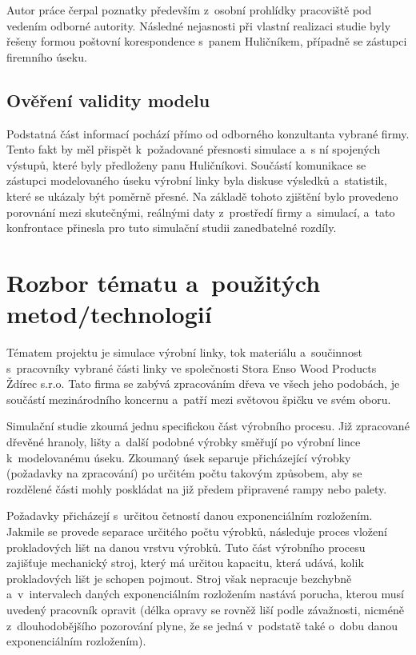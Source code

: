 \documentclass[a4paper, 11pt]{article}
\begin{document}
    Autor práce čerpal poznatky především z~osobní prohlídky pracoviště pod vedením odborné autority.
    Následné nejasnosti při vlastní realizaci studie byly řešeny formou poštovní korespondence s~panem Huličníkem, případně se zástupci firemního úseku.

\subsection{Ověření validity modelu}
    Podstatná část informací pochází přímo od odborného konzultanta vybrané firmy.
    Tento fakt by měl přispět k~požadované přesnosti simulace a~s ní spojených výstupů, které byly předloženy panu Huličníkovi.
    Součástí komunikace se zástupci modelovaného úseku výrobní linky byla diskuse výsledků a~statistik, které se ukázaly být poměrně přesné.
    Na základě tohoto zjištění bylo provedeno porovnání mezi skutečnými, reálnými daty z~prostředí firmy a~simulací, a~tato konfrontace přinesla pro tuto simulační studii zanedbatelné rozdíly.

\newpage

\section{Rozbor tématu a~použitých metod/technologií}
    Tématem projektu je simulace výrobní linky, tok materiálu a~součinnost s~pracovníky vybrané části linky ve společnosti Stora Enso Wood Products Ždírec s.r.o.
    Tato firma se zabývá zpracováním dřeva ve všech jeho podobách, je součástí mezinárodního koncernu a~patří mezi světovou špičku ve svém oboru.

    Simulační studie zkoumá jednu specifickou část výrobního procesu.
    Již zpracované dřevěné hranoly, lišty a~další podobné výrobky směřují po výrobní lince k~modelovanému úseku.
    Zkoumaný úsek separuje přicházející výrobky (požadavky na zpracování) po určitém počtu takovým způsobem, aby se rozdělené části mohly poskládat na již předem připravené rampy nebo palety.

    Požadavky přicházejí s~určitou četností danou exponenciálním rozložením.
    Jakmile se provede separace určitého počtu výrobků, následuje proces vložení prokladových lišt na danou vrstvu výrobků.
    Tuto část výrobního procesu zajišťuje mechanický stroj, který má určitou kapacitu, která udává, kolik prokladových lišt je schopen pojmout.
    Stroj však nepracuje bezchybně a~v~intervalech daných exponenciálním rozložením nastává porucha, kterou musí uvedený pracovník opravit (délka opravy se rovněž liší podle závažnosti, nicméně z~dlouhodobějšího pozorování plyne, že se jedná v~podstatě také o~dobu danou exponenciálním rozložením).
\end{document}
